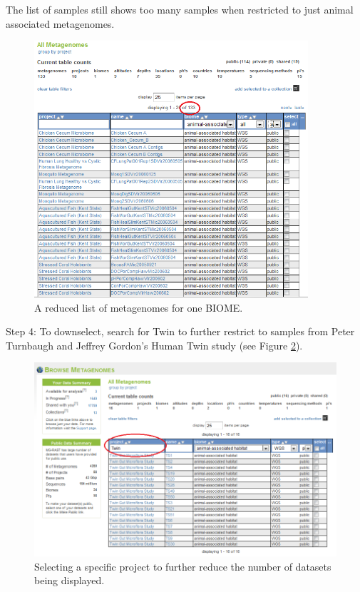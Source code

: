 \documentclass[12pt,fullpage]{report}
\begin{document}
The list of samples still shows too many samples when restricted to just animal associated metagenomes.

\begin{figure}
\begin{center}
\includegraphics[width=4in]{Images/collections-filtered-but-too-many.png}
\end{center}
\caption{
A reduced list of metagenomes for one BIOME. }
\label{fig:collections-filtered-but-too-many}
\end{figure}

Step 4: To downselect, search for Twin to further restrict to samples from Peter Turnbaugh and Jeffrey Gordon's Human Twin study (see Figure \ref{fig:collections-twin}).

\begin{figure}[ht]
\begin{center}
\includegraphics[width=6in]{Images/collections-twin.png}
\end{center}
\caption{
Selecting a specific project to further reduce the number of datasets being displayed. }
\label{fig:collections-twin}
\end{figure}
\end{document}
